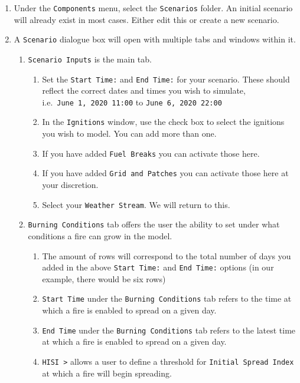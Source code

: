 \documentclass[
  letterpaper,
  DIV=11,
  numbers=noendperiod]{scrreprt}
\providecommand{\tightlist}{%
  \setlength{\itemsep}{0pt}\setlength{\parskip}{0pt}}
\begin{document}
\begin{enumerate}
\def\labelenumi{\arabic{enumi}.}
\tightlist
\item
  Under the \texttt{Components} menu, select the \texttt{Scenarios}
  folder. An initial scenario will already exist in most cases. Either
  edit this or create a new scenario.
\item
  A \texttt{Scenario} dialogue box will open with multiple tabs and
  windows within it.

  \begin{enumerate}
  \def\labelenumii{\roman{enumii}.}
  \tightlist
  \item
    \texttt{Scenario\ Inputs} is the main tab.

    \begin{enumerate}
    \def\labelenumiii{\alph{enumiii}.}
    \tightlist
    \item
      Set the \texttt{Start\ Time:} and \texttt{End\ Time:} for your
      scenario. These should reflect the correct dates and times you
      wish to simulate, i.e.~\texttt{June\ 1,\ 2020\ 11:00} to
      \texttt{June\ 6,\ 2020\ 22:00}
    \item
      In the \texttt{Ignitions} window, use the check box to select the
      ignitions you wish to model. You can add more than one.
    \item
      If you have added \texttt{Fuel\ Breaks} you can activate those
      here.
    \item
      If you have added \texttt{Grid\ and\ Patches} you can activate
      those here at your discretion.
    \item
      Select your \texttt{Weather\ Stream}. We will return to this.
    \end{enumerate}
  \item
    \texttt{Burning\ Conditions} tab offers the user the ability to set
    under what conditions a fire can grow in the model.

    \begin{enumerate}
    \def\labelenumiii{\alph{enumiii}.}
    \tightlist
    \item
      The amount of rows will correspond to the total number of days you
      added in the above \texttt{Start\ Time:} and \texttt{End\ Time:}
      options (in our example, there would be six rows)
    \item
      \texttt{Start\ Time} under the \texttt{Burning\ Conditions} tab
      refers to the time at which a fire is enabled to spread on a given
      day.
    \item
      \texttt{End\ Time} under the \texttt{Burning\ Conditions} tab
      refers to the latest time at which a fire is enabled to spread on
      a given day.
    \item
      \texttt{HISI\ \textgreater{}} allows a user to define a threshold
      for \texttt{Initial\ Spread\ Index} at which a fire will begin
      spreading.


\end{enumerate}
\end{enumerate}
\end{enumerate}
\end{document}
